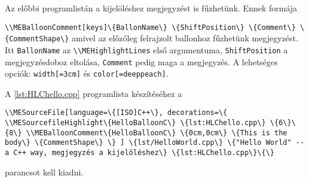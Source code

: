 {
Az előbbi programlistán a kijelöléshez megjegyzést is fűzhetünk.
Ennek formája 
\par\noindent\lstinline|\\MEBalloonComment[keys]\{BallonName\} \{ShiftPosition\} \{Comment\} \{CommentShape\}|
amivel az előzőleg felrajzolt ballonhoz fűzhetünk megjegyzést.
Itt \lstinline|BallonName| az \lstinline|\\MEHighlightLines| első argumentuma,
\lstinline|ShiftPosition| a megjegyzésdoboz eltolása, \lstinline|Comment| pedig maga 
a megjegyzés.
A lehetséges opciók: \lstinline|width[=3cm]| és \lstinline|color[=deeppeach]|.

A \ref{lst:HLChello.cpp} programlista készítéséhez a

\par\noindent\lstinline|\\MESourceFile[language=\{[ISO]C++\},
decorations=\{
\\MESourcefileHighlight\{HelloBalloonC\} \{lst:HLChello.cpp\} \{6\}\{8\}
\\MEBalloonComment\{HelloBalloonC\} \{0cm,0cm\} \{This is the body\} \{CommentShape\}
\}
] \{lst/HelloWorld.cpp\} \{"Hello World" -- a C++ way, megjegyzés a kijelöléshez\} \{lst:HLChello.cpp\}\{\}|

parancsot kell kiadni.

}


